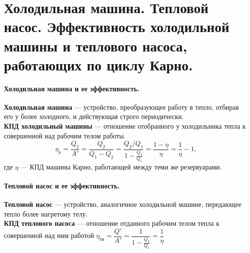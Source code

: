 \section{\normalsize Холодильная машина. Тепловой насос. Эффективность холодильной машины и теплового насоса, работающих по циклу Карно.}
\paragraph{Холодильная машина и ее эффективность.} \textbf{Холодильная машина} --- устройство, преобразующее работу в тепло, отбирая его у более холодного, и действующая строго периодически.\\
\textbf{КПД холодильный машины} --- отношение отобранного у холодильника тепла к совершенной над рабочим телом работы. $$\eta_\text{х}=\dfrac{Q_2}{A'}=\dfrac{Q_2}{Q_1-Q_2}=\dfrac{Q_2/Q_1}{1-\frac{Q_2}{Q_1}}=\dfrac{1-\eta}{\eta}=\dfrac{1}{\eta}-1,$$ где $\eta$ --- КПД машины Карно, работающей между теми же резервуарами.
\paragraph{Тепловой насос и ее эффективность.} \textbf{Тепловой насос} --- устройство, аналогичное холодильной машине, передающее тепло более нагретому телу.\\
\textbf{КПД теплового насоса} --- отношение отданного рабочим телом тепла к совершенной над ним работой $\eta_\text{тн}=\dfrac{Q'}{A'}=\dfrac{1}{1-\frac{Q_2}{Q_1}}=\dfrac{1}{\eta}$ 